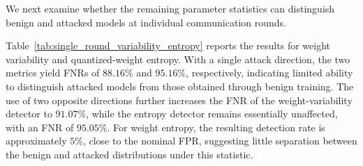 We next examine whether the remaining parameter statistics can distinguish benign and attacked models at individual communication rounds.

Table~\ref{tab:single_round_variability_entropy} reports the results for weight variability and quantized-weight entropy. With a single attack direction, the two metrics yield FNRs of $88.16\%$ and $95.16\%$, respectively, indicating limited ability to distinguish attacked models from those obtained through benign training. The use of two opposite directions further increases the FNR of the weight-variability detector to $91.07\%$, while the entropy detector remains essentially unaffected, with an FNR of $95.05\%$. For weight entropy, the resulting detection rate is approximately $5\%$, close to the nominal FPR, suggesting little separation between the benign and attacked distributions under this statistic.







